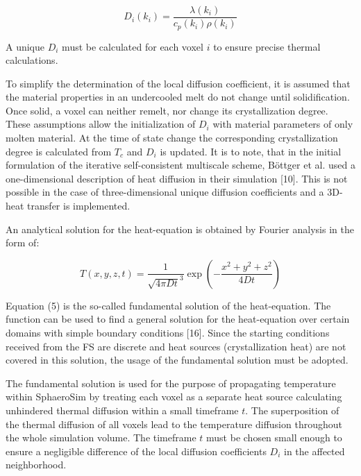 \documentclass[10pt]{article}
\begin{document}
\begin{equation*}
D_{i}\left(k_{i}\right)=\frac{\lambda\left(k_{i}\right)}{c_{p}\left(k_{i}\right) \rho\left(k_{i}\right)} \tag{4}
\end{equation*}


A unique $D_{i}$ must be calculated for each voxel $i$ to ensure precise thermal calculations.

To simplify the determination of the local diffusion coefficient, it is assumed that the material properties in an undercooled melt do not change until solidification. Once solid, a voxel can neither remelt, nor change its crystallization degree. These assumptions allow the initialization of $D_{i}$ with material parameters of only molten material. At the time of state change the corresponding crystallization degree is calculated from $T_{c}$ and $D_{i}$ is updated. It is to note, that in the initial formulation of the iterative self-consistent multiscale scheme, Böttger et al. used a one-dimensional description of heat diffusion in their simulation [10]. This is not possible in the case of three-dimensional unique diffusion coefficients and a 3D-heat transfer is implemented.

An analytical solution for the heat-equation is obtained by Fourier analysis in the form of:


\begin{equation*}
T(x, y, z, t)=\frac{1}{\sqrt{4 \pi D t}^{3}} \exp \left(-\frac{x^{2}+y^{2}+z^{2}}{4 D t}\right) \tag{5}
\end{equation*}


Equation (5) is the so-called fundamental solution of the heat-equation. The function can be used to find a general solution for the heat-equation over certain domains with simple boundary conditions [16]. Since the starting conditions received from the FS are discrete and heat sources (crystallization heat) are not covered in this solution, the usage of the fundamental solution must be adopted.

The fundamental solution is used for the purpose of propagating temperature within SphaeroSim by treating each voxel as a separate heat source calculating unhindered thermal diffusion within a small timeframe $t$. The superposition of the thermal diffusion of all voxels lead to the temperature diffusion throughout the whole simulation volume. The timeframe $t$ must be chosen small enough to ensure a negligible difference of the local diffusion coefficients $D_{i}$ in the affected neighborhood.
\end{document}
